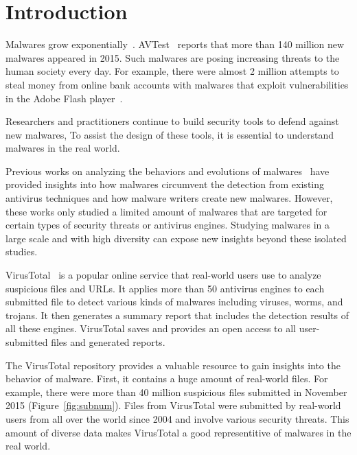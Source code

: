 
\section{Introduction}

Malwares grow exponentially~\cite{avtest}. 
AVTest~\cite{avtest} reports that more than 140 million new malwares appeared in 2015. 
Such malwares are posing increasing threats to the human society every day. 
For example, there were almost 2 million attempts to 
steal money from online bank accounts 
with malwares that exploit vulnerabilities in the Adobe Flash player~\cite{kaspersky}. 

Researchers and practitioners continue to build security tools to defend against new malwares,
To assist the design of these tools, it is essential to understand malwares in the real world. 

Previous works on analyzing the behaviors and evolutions of malwares~\cite{ZhouSP2012,GuptaComsnets2009} 
have provided insights 
into how malwares circumvent the detection from existing antivirus techniques and how malware writers create new malwares. 
However, these works only studied a limited amount of malwares that are targeted for certain types of security threats or antivirus engines.
Studying malwares in a large scale and with high diversity can expose new insights beyond these isolated studies.

VirusTotal~\cite{virustotal} is a popular online service that real-world users use to analyze suspicious files and URLs.
It applies more than 50 antivirus engines to each submitted file 
to detect various kinds of malwares including viruses, worms, and trojans. 
It then generates a summary report that includes the detection results of all these engines. 
VirusTotal saves and provides an open access to all user-submitted files and generated reports. 

The VirusTotal repository provides a valuable resource to gain insights into 
the behavior of malware.
%
First, it contains a huge amount of real-world files.
For example, there were more than 40 million suspicious files submitted in November 2015 (Figure~\ref{fig:subnum}). 
Files from VirusTotal were submitted by real-world users from all over the world since 2004
and involve various security threats. 
This amount of diverse data makes VirusTotal a good representitive of malwares in the real world. 

